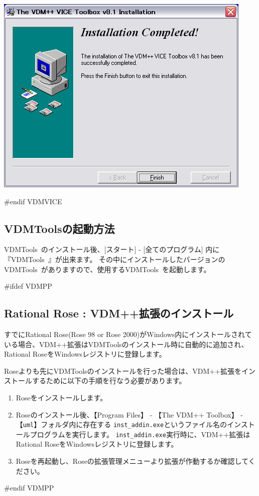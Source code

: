 \documentclass[\pformat,12pt]{jarticle}
\newcommand{\Toolbox}{VDMTools}
\newcommand{\Toolbox}{VDMTools}
\newcommand{\Toolbox}{VDMTools}
\begin{document}
\begin{enumerate}
\begin{center}
\includegraphics[scale=0.42,bb=0 0 467 364]{install_vice_finish.png}
\end{center}
#endif VDMVICE
\end{enumerate}

\subsection{VDMToolsの起動方法}
\Toolbox\ のインストール後、[スタート] - [全てのプログラム] 内に『\Toolbox\ 』が出来ます。
その中にインストールしたバージョンの\Toolbox\ がありますので、使用する\Toolbox\ を起動します。

#ifdef VDMPP
\subsection{Rational Rose : VDM++拡張のインストール}
すでにRational Rose(Rose 98 or Rose 2000)がWindows内にインストールされている場合、VDM++拡張は\Toolbox{}のインストール時に自動的に追加され、Rational RoseをWindowsレジストリに登録します。

Roseよりも先に\Toolbox{}のインストールを行った場合は、VDM++拡張をインストールするために以下の手順を行なう必要があります。

\begin{enumerate}
	\item Roseをインストールします。
	\item Roseのインストール後、【Program Files】 - 【The VDM++ Toolbox】 - 【{\tt uml}】フォルダ内に存在する
{\tt inst\_addin.exe}というファイル名のインストールプログラムを実行します。
{\tt inst\_addin.exe}実行時に、VDM++拡張はRational RoseをWindowsレジストリに登録します。
	\item Roseを再起動し、Roseの拡張管理メニューより拡張が作動するか確認してください。
\end{enumerate}
#endif VDMPP
\end{document}
